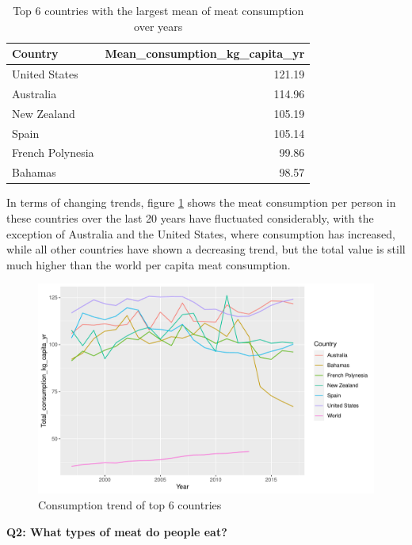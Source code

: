 \documentclass[11pt,a4paper,]{article}
\begin{document}
\begin{table}

\caption{\label{tab:highest-meanconsumption}Top 6 countries with the largest mean of meat consumption over years}
\centering
\begin{tabular}[t]{l|r}
\hline
Country & Mean\_consumption\_kg\_capita\_yr\\
\hline
United States & 121.19\\
\hline
Australia & 114.96\\
\hline
New Zealand & 105.19\\
\hline
Spain & 105.14\\
\hline
French Polynesia & 99.86\\
\hline
Bahamas & 98.57\\
\hline
\end{tabular}
\end{table}
\clearpage

In terms of changing trends, figure \ref{fig:highest-consumption-trend} shows the meat consumption per person in these countries over the last 20 years have fluctuated considerably, with the exception of Australia and the United States, where consumption has increased, while all other countries have shown a decreasing trend, but the total value is still much higher than the world per capita meat consumption.

\begin{figure}
\centering
\includegraphics{report_files/figure-latex/highest-consumption-trend-1.pdf}
\caption{\label{fig:highest-consumption-trend}Consumption trend of top 6 countries}
\end{figure}

\clearpage

\textbf{Q2: What types of meat do people eat?}
\end{document}
